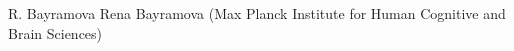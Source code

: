 
                {R. Bayramova}
                {Rena Bayramova (Max Planck Institute for Human Cognitive and Brain Sciences)}
                